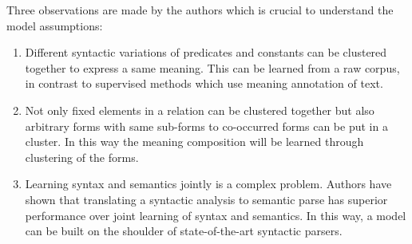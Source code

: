 Three observations are made by the authors which is crucial to understand the model assumptions:

\begin{enumerate}
  \item Different syntactic variations of predicates and constants can be clustered together to express
   a same meaning. This can be learned from a raw corpus, in contrast to supervised methods which use meaning annotation of text.
   \item Not only fixed elements in a relation can be clustered together but also arbitrary forms with same sub-forms to co-occurred forms 
   can be put in a cluster. In this way the meaning composition will be learned through clustering of the forms.
   \item Learning syntax and semantics jointly is a complex problem. Authors have shown that translating a syntactic analysis
   to semantic parse has superior performance over joint learning of syntax and semantics. In this way, a model can be built on the shoulder
   of state-of-the-art syntactic parsers.
   
\end{enumerate}

